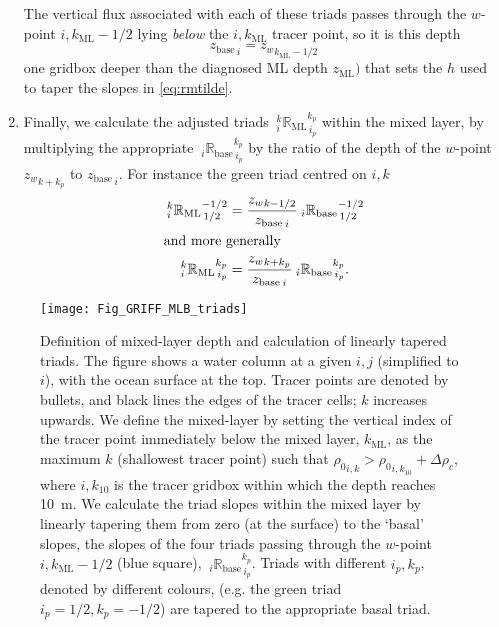 \documentclass[../main/NEMO_manual]{subfiles}
\begin{document}
\begin{enumerate}
The vertical flux associated with each of these triads passes through
the $w$-point $i,k_{\mathrm{ML}}-1/2$ lying \emph{below} the $i,k_{\mathrm{ML}}$ tracer point, so it is this depth
\[
  {z_\mathrm{base}}_{\,i}={z_{w}}_{k_\mathrm{ML}-1/2}
\]
one gridbox deeper than the diagnosed ML depth $z_{\mathrm{ML}})$ that sets the $h$ used to taper the slopes in
\autoref{eq:rmtilde}.
\item
  Finally, we calculate the adjusted triads ${\:}_i^k{\mathbb{R}_{\mathrm{ML}}}_{\,i_p}^{k_p}$ within
  the mixed layer, by multiplying the appropriate ${\:}_i{\mathbb{R}_{\mathrm{base}}}_{\,i_p}^{k_p}$ by
  the ratio of the depth of the $w$-point ${z_w}_{k+k_p}$ to ${z_{\mathrm{base}}}_{\,i}$.
  For instance the green triad centred on $i,k$
  \begin{align*}
    {\:}_i^k{\mathbb{R}_{\mathrm{ML}}}_{\,1/2}^{-1/2} &=
                                                        \frac{{z_w}_{k-1/2}}{{z_{\mathrm{base}}}_{\,i}}{\:}_i{\mathbb{R}_{\mathrm{base}}}_{\,1/2}^{-1/2} \\
    \intertext{and more generally}
    {\:}_i^k{\mathbb{R}_{\mathrm{ML}}}_{\,i_p}^{k_p} &=
                                                       \frac{{z_w}_{k+k_p}}{{z_{\mathrm{base}}}_{\,i}}{\:}_i{\mathbb{R}_{\mathrm{base}}}_{\,i_p}^{k_p}.
  \end{align*}
\end{enumerate}

\begin{figure}[h]
  \caption{
    \protect\label{fig:MLB_triad}
    Definition of mixed-layer depth and calculation of linearly tapered triads.
    The figure shows a water column at a given $i,j$ (simplified to $i$), with the ocean surface at the top.
    Tracer points are denoted by bullets, and black lines the edges of the tracer cells;
    $k$ increases upwards.
    \newline
    \hspace{5 em}
    We define the mixed-layer by setting the vertical index of the tracer point immediately below the mixed layer,
    $k_{\mathrm{ML}}$, as the maximum $k$ (shallowest tracer point) such that
    ${\rho_0}_{i,k}>{\rho_0}_{i,k_{10}}+\Delta\rho_c$,
    where $i,k_{10}$ is the tracer gridbox within which the depth reaches 10~m.
    We calculate the triad slopes within the mixed layer by linearly tapering them from zero
    (at the surface) to the `basal' slopes,
    the slopes of the four triads passing through the $w$-point $i,k_{\mathrm{ML}}-1/2$ (blue square),
    ${\:}_i{\mathbb{R}_{\mathrm{base}}}_{\,i_p}^{k_p}$.
    Triads with different $i_p,k_p$, denoted by different colours,
    (e.g. the green triad $i_p=1/2,k_p=-1/2$) are tapered to the appropriate basal triad.}
  \texttt{[image: Fig\_GRIFF\_MLB\_triads]}
\end{figure}
\end{document}

